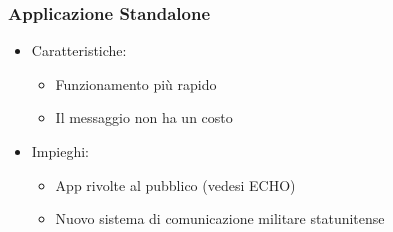\begin{frame}
 \frametitle{Applicazione Standalone}
 
 \begin{itemize}
  \item<1-> Caratteristiche:
  \begin{itemize}
   \item Funzionamento più rapido
   \item Il messaggio non ha un costo
  \end{itemize}
   \item<2-> Impieghi:
  \begin{itemize}
   \item App rivolte al pubblico (vedesi ECHO)
   \item Nuovo sistema di comunicazione militare statunitense
  \end{itemize}
 \end{itemize}


\end{frame}
